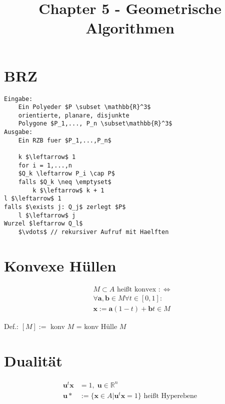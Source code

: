 \documentclass[8pt, DIV15, twocolumn]{scrartcl}
\title{Chapter 5 - Geometrische Algorithmen}
\date{}
\begin{document}
\setlength{\abovedisplayskip}{0pt}
\setlength{\belowdisplayskip}{0pt}
\setlength{\parskip}{0pt}
\setlength{\topmargin}{0pt}

 
\maketitle

\thispagestyle{empty}

\section*{BRZ}

\begin{lstlisting}[mathescape=true]
Eingabe:
	Ein Polyeder $P \subset \mathbb{R}^3$
	orientierte, planare, disjunkte 
	Polygone $P_1,..., P_n \subset\mathbb{R}^3$
Ausgabe:
	Ein RZB fuer $P_1,...,P_n$

	k $\leftarrow$ 1
	for i = 1,...,n
	$Q_k \leftarrow P_i \cap P$
	falls $Q_k \neq \emptyset$
		k $\leftarrow$ k + 1
l $\leftarrow$ 1
falls $\exists j: Q_j$ zerlegt $P$
	l $\leftarrow$ j
Wurzel $leftarrow Q_l$
	$\vdots$ // rekursiver Aufruf mit Haelften
\end{lstlisting}

\section*{Konvexe Hüllen}

\begin{equation*}
\begin{aligned}
&M \subset A \text{ heißt konvex }:\Leftrightarrow \\
&\forall \mathbf{a}, \mathbf{b} \in M \forall t \in [0,1]: \\
&\mathbf{x} := \mathbf{a} \left(1-t\right) + \mathbf{b} t \in M
\end{aligned}
\end{equation*}

Def.: $[M] := $ konv $M$ = konv Hülle $M$

\section*{Dualität}

\begin{equation*}
\begin{aligned}
\mathbf{u}^t \mathbf{x} &= 1, \; \mathbf{u} \in \mathbb{R}^n \\
\mathbf{u}* &:= \{\mathbf{x}\in A| \mathbf{u}^t\mathbf{x} = 1\} \text{ heißt Hyperebene}
\end{aligned}
\end{equation*}
\end{document}
